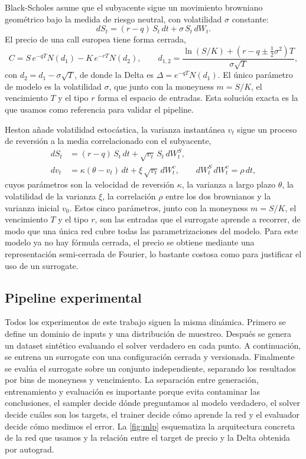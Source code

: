 \documentclass[11pt,a4paper]{article}
\begin{document}
Black-Scholes asume que el subyacente sigue un movimiento browniano geométrico bajo la medida de riesgo neutral, con volatilidad $\sigma$ constante:
\begin{equation}
dS_t = (r - q)\,S_t\,dt + \sigma\,S_t\,dW_t.
\label{eq:bs-sde}
\end{equation}
El precio de una call europea tiene forma cerrada,
\begin{equation}
C = S\,e^{-qT} N(d_1) - K\,e^{-rT} N(d_2), \qquad
d_{1,2} = \frac{\ln(S/K) + \left(r - q \pm \tfrac{1}{2}\sigma^2\right)T}{\sigma\sqrt{T}},
\label{eq:bs-price}
\end{equation}
con $d_2 = d_1 - \sigma\sqrt{T}$, de donde la Delta es $\Delta = e^{-qT} N(d_1)$. El único parámetro de modelo es la volatilidad $\sigma$, que junto con la moneyness $m = S/K$, el vencimiento $T$ y el tipo $r$ forma el espacio de entradas. Esta solución exacta es la que usamos como referencia para validar el pipeline.

Heston añade volatilidad estocástica, la varianza instantánea $v_t$ sigue un proceso de reversión a la media correlacionado con el subyacente,
\begin{equation}
\begin{aligned}
dS_t &= (r - q)\,S_t\,dt + \sqrt{v_t}\,S_t\,dW_t^{S}, \\
dv_t &= \kappa(\theta - v_t)\,dt + \xi\,\sqrt{v_t}\,dW_t^{v},
\qquad dW_t^{S}\,dW_t^{v} = \rho\,dt,
\end{aligned}
\label{eq:heston-sde}
\end{equation}
cuyos parámetros son la velocidad de reversión $\kappa$, la varianza a largo plazo $\theta$, la volatilidad de la varianza $\xi$, la correlación $\rho$ entre los dos brownianos y la varianza inicial $v_0$. Estos cinco parámetros, junto con la moneyness $m = S/K$, el vencimiento $T$ y el tipo $r$, son las entradas que el surrogate aprende a recorrer, de modo que una única red cubre todas las parametrizaciones del modelo. Para este modelo ya no hay fórmula cerrada, el precio se obtiene mediante una representación semi-cerrada de Fourier, lo bastante costosa como para justificar el uso de un surrogate.

\subsection{Pipeline experimental}

Todos los experimentos de este trabajo siguen la misma dinámica. Primero se define un dominio de inputs y una distribución de muestreo. Después se genera un dataset sintético evaluando el solver verdadero en cada punto. A continuación, se entrena un surrogate con una configuración cerrada y versionada. Finalmente se evalúa el surrogate sobre un conjunto independiente, separando los resultados por bins de moneyness y vencimiento. La separación entre generación, entrenamiento y evaluación es importante porque evita contaminar las conclusiones, el sampler decide dónde preguntamos al modelo verdadero, el solver decide cuáles son los targets, el trainer decide cómo aprende la red y el evaluador decide cómo medimos el error. La \autoref{fig:mlp} esquematiza la arquitectura concreta de la red que usamos y la relación entre el target de precio y la Delta obtenida por autograd.
\end{document}
